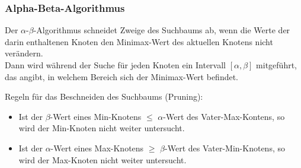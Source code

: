 \subsubsection{Alpha-Beta-Algorithmus}
Der $\alpha$-$\beta$-Algorithmus schneidet Zweige des Suchbaums ab, wenn die Werte der darin enthaltenen Knoten den Minimax-Wert des aktuellen Knotens nicht verändern.\\
Dann wird während der Suche für jeden Knoten ein Intervall $[\alpha, \beta]$ mitgeführt, das angibt, in welchem Bereich sich der Minimax-Wert befindet.

Regeln für das Beschneiden des Suchbaums (Pruning):
\begin{itemize}
\item Ist der $\beta$-Wert eines Min-Knotens $\leq$ $\alpha$-Wert des Vater-Max-Kontens, so wird der Min-Knoten nicht weiter untersucht.
\begin{center}
\end{center}
\item Ist der $\alpha$-Wert eines Max-Knotens $\geq$ $\beta$-Wert des Vater-Min-Knotens, so wird der Max-Knoten nicht weiter untersucht.
\begin{center}
\end{center}
\end{itemize}

